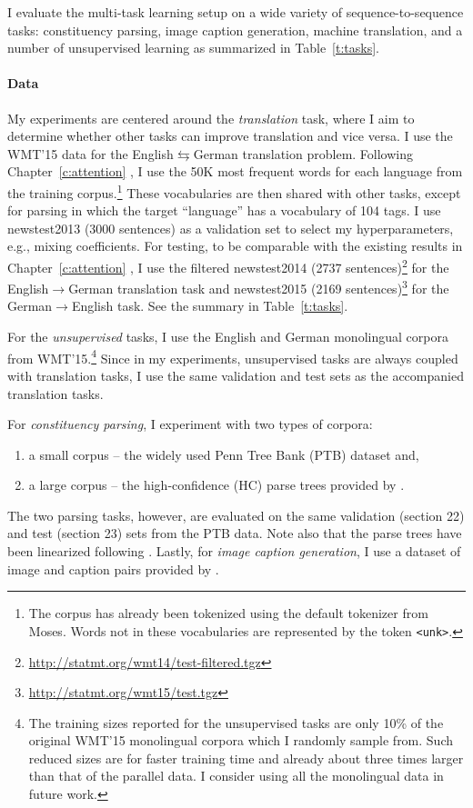 I evaluate the multi-task learning setup on a wide variety of
sequence-to-sequence tasks: constituency parsing, image caption
generation, machine translation, and a number of unsupervised learning as
summarized in Table~\ref{t:tasks}.

\paragraph{Data}
My experiments are centered around the {\it translation} task, where I aim to determine 
whether other tasks can improve translation and vice versa. I use the WMT'15 data
\citep{bojar15} for the English$\leftrightarrows$German
translation problem. Following 
Chapter~\ref{c:attention} \cite{luong15attn}, I use the 50K most frequent words for each
language from the training corpus.\footnote{The corpus has already been tokenized using the default
tokenizer from Moses.  Words not in these vocabularies are represented by the token
\texttt{<unk>}.} These vocabularies are then shared with other tasks, except for
parsing in which the target ``language'' has a vocabulary of 104 tags. 
I use newstest2013 (3000 sentences) as a validation set to select my
hyperparameters, e.g., mixing coefficients. For testing, to be comparable with the existing results
in Chapter~\ref{c:attention} \cite{luong15attn}, I use the filtered
newstest2014 (2737
sentences)\footnote{\url{http://statmt.org/wmt14/test-filtered.tgz}} for the
English$\rightarrow$German translation task and newstest2015 (2169
sentences)\footnote{\url{http://statmt.org/wmt15/test.tgz}}
for the German$\rightarrow$English task.
See the summary in Table~\ref{t:tasks}.

For the {\it unsupervised} tasks, I use the English and German monolingual corpora
from WMT'15.\footnote{The training sizes reported for
the unsupervised tasks are
only 10\% of
the original WMT'15 monolingual corpora which I randomly sample from. Such reduced sizes are
for faster training time and already about three times larger than that of the parallel
data. I consider using all the monolingual data in future work.} Since in
my experiments, unsupervised tasks are always coupled with translation tasks,
I use the same validation and test sets as the accompanied translation tasks.

For {\it constituency parsing}, I experiment with two types of corpora:
\begin{enumerate}
\item a small corpus -- the widely used
Penn Tree Bank (PTB) dataset \citep{Marcus:1993:BLA} and,
\item a large corpus -- the high-confidence (HC) parse trees 
provided by \citet{vinyals15grammar}.
\end{enumerate}
The two parsing tasks, however, are evaluated on the same validation (section
22) and test (section 23)
sets from the PTB data. Note also that the parse trees have been linearized
following \citet{vinyals15grammar}. 
Lastly, for {\it image caption generation}, I use a dataset of image and caption pairs provided by
\citet{vinyals15caption}.

